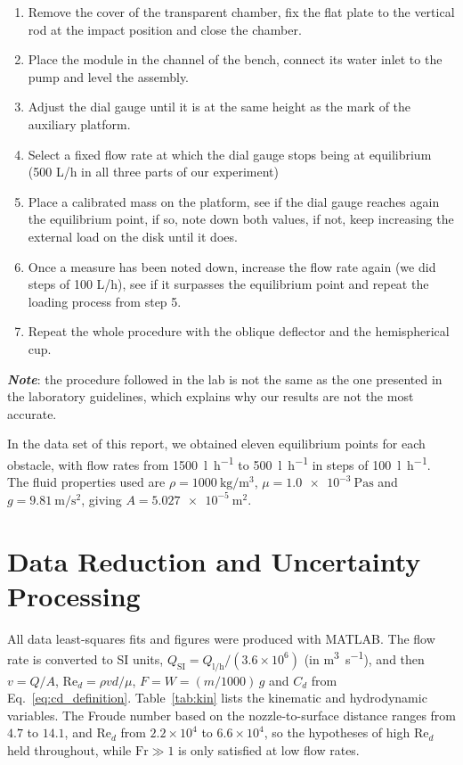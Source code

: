 \documentclass[11pt,a4paper]{article}
\numberwithin{equation}{section}
\newcommand{\Cd}{C_d}
\newcommand{\Red}{\mathrm{Re}_d}
\begin{document}
\begin{enumerate}[leftmargin=1.5em, itemsep=0.2em]
  \item Remove the cover of the transparent chamber, fix the flat plate to the vertical rod at the impact position and close the chamber.
  \item Place the module in the channel of the bench, connect its water inlet to the pump and level the assembly.
  \item Adjust the dial gauge until it is at the same height as the mark of the auxiliary platform.
  \item Select a fixed flow rate at which the dial gauge stops being at equilibrium (500 L/h in all three parts of our experiment)
  \item Place a calibrated mass on the platform, see if the dial gauge reaches again the equilibrium point, if so, note down both values, if not, keep increasing the external load on the disk until it does.
  \item Once a measure has been noted down, increase the flow rate again (we did steps of 100 L/h), see if it surpasses the equilibrium point and repeat the loading process from step 5.
  \item Repeat the whole procedure with the oblique deflector and the hemispherical cup.
\end{enumerate}\textbf{\textit{Note}}: the procedure followed in the lab is not the same as the one presented in the laboratory guidelines, which explains why our results are not the most accurate.

In the data set of this report, we obtained eleven equilibrium points for each obstacle, with flow rates from \SI{1500}{\litre\per\hour} to \SI{500}{\litre\per\hour} in steps of \SI{100}{\litre\per\hour}. The fluid properties used are $\rho=\SI{1000}{\kilogram\per\metre\cubed}$, $\mu=\SI{1.0e-3}{\pascal\second}$ and $g=\SI{9.81}{\metre\per\second\squared}$, giving $A=\SI{5.027e-5}{\metre\squared}$.

\section{Data Reduction and Uncertainty Processing}

All data least-squares fits and figures were produced with MATLAB. The flow rate is converted to SI units, $Q_{\mathrm{SI}}=Q_{\mathrm{l/h}}/(3.6\times10^{6})$ (in \si{\metre\cubed\per\second}), and then $v=Q/A$, $\Red=\rho vd/\mu$, $F=W=(m/1000)\,g$ and $\Cd$ from Eq.~\eqref{eq:cd_definition}. Table~\ref{tab:kin} lists the kinematic and hydrodynamic variables. The Froude number based on the nozzle-to-surface distance ranges from $4.7$ to $14.1$, and $\Red$ from $2.2\times10^4$ to $6.6\times10^4$, so the hypotheses of high $\Red$ held throughout, while $\mathrm{Fr}\gg1$ is only satisfied at low flow rates.
\end{document}
